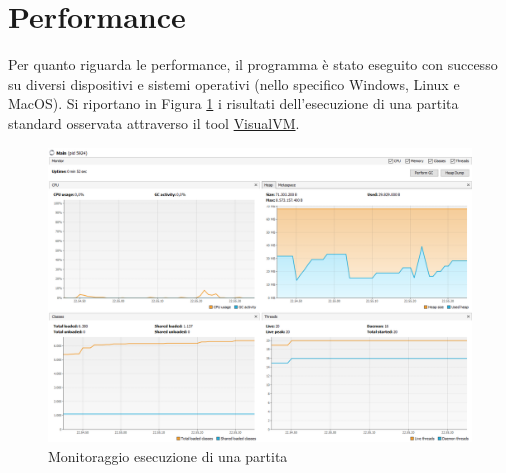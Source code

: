 \section{Performance}
    Per quanto riguarda le performance, il programma è stato eseguito con successo su diversi dispositivi e sistemi operativi (nello specifico Windows, Linux e MacOS). Si riportano in Figura \ref{fig:visualvm} i risultati dell'esecuzione di una partita standard osservata attraverso il tool \href{https://visualvm.github.io/}{VisualVM}.
    \begin{figure}[H]
        \centering
        \includegraphics[width=\textwidth]{Images/VisualVM.png}
        \caption{Monitoraggio esecuzione di una partita}
        \label{fig:visualvm}
    \end{figure}